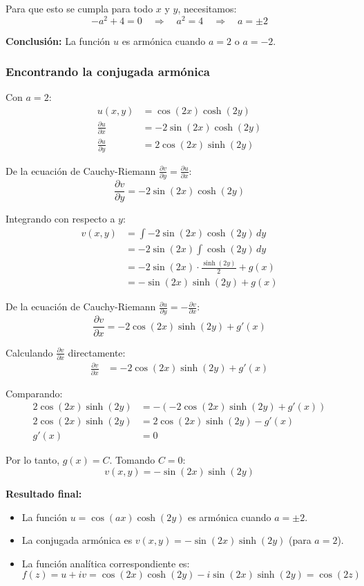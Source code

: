 \documentclass{article}
\begin{document}
Para que esto se cumpla para todo $x$ y $y$, necesitamos:
$$-a^2 + 4 = 0 \quad \Rightarrow \quad a^2 = 4 \quad \Rightarrow \quad a = \pm 2$$

\textbf{Conclusión:} La función $u$ es armónica cuando $a = 2$ o $a = -2$.

\subsubsection*{Encontrando la conjugada armónica}

Con $a = 2$:
\begin{align*}
u(x,y) &= \cos(2x)\cosh(2y) \\
\frac{\partial u}{\partial x} &= -2\sin(2x)\cosh(2y) \\
\frac{\partial u}{\partial y} &= 2\cos(2x)\sinh(2y)
\end{align*}

De la ecuación de Cauchy-Riemann $\frac{\partial v}{\partial y} = \frac{\partial u}{\partial x}$:
$$\frac{\partial v}{\partial y} = -2\sin(2x)\cosh(2y)$$

Integrando con respecto a $y$:
\begin{align*}
v(x,y) &= \int -2\sin(2x)\cosh(2y) \, dy \\
       &= -2\sin(2x) \int \cosh(2y) \, dy \\
       &= -2\sin(2x) \cdot \frac{\sinh(2y)}{2} + g(x) \\
       &= -\sin(2x)\sinh(2y) + g(x)
\end{align*}

De la ecuación de Cauchy-Riemann $\frac{\partial u}{\partial y} = -\frac{\partial v}{\partial x}$:
$$\frac{\partial v}{\partial x} = -2\cos(2x)\sinh(2y) + g'(x)$$

Calculando $\frac{\partial v}{\partial x}$ directamente:
\begin{align*}
\frac{\partial v}{\partial x} &= -2\cos(2x)\sinh(2y) + g'(x)
\end{align*}

Comparando:
\begin{align*}
2\cos(2x)\sinh(2y) &= -(-2\cos(2x)\sinh(2y) + g'(x)) \\
2\cos(2x)\sinh(2y) &= 2\cos(2x)\sinh(2y) - g'(x) \\
g'(x) &= 0
\end{align*}

Por lo tanto, $g(x) = C$. Tomando $C = 0$:
$$v(x,y) = -\sin(2x)\sinh(2y)$$

\textbf{Resultado final:}
\begin{itemize}
\item La función $u = \cos(ax)\cosh(2y)$ es armónica cuando $a = \pm 2$.
\item La conjugada armónica es $v(x,y) = -\sin(2x)\sinh(2y)$ (para $a = 2$).
\item La función analítica correspondiente es:
$$f(z) = u + iv = \cos(2x)\cosh(2y) - i\sin(2x)\sinh(2y) = \cos(2z)$$
\end{itemize}
\end{document}

